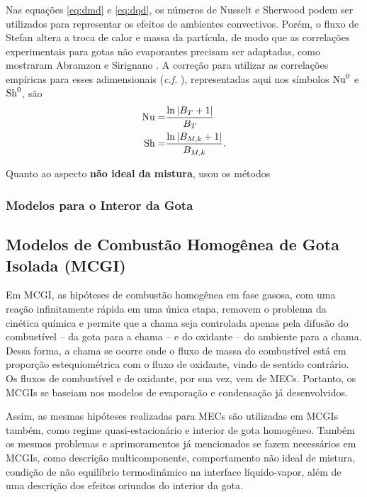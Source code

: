 Nas equações \eqref{eq:dmd} e \eqref{eq:dqd}, os números de Nusselt e Sherwood podem ser utilizados para representar os efeitos de ambientes convectivos.
Porém, o fluxo de Stefan altera a troca de calor e massa da partícula, de modo que as correlações experimentais para gotas não evaporantes precisam ser adaptadas, como mostraram Abramzon e Sirignano \cite{Sirignano1989}.
A correção para utilizar as correlações empíricas para esses adimensionais  (\emph{c.f.} \cite[eqs. (8) e (9)]{SacomanoF2025CF}), representadas aqui nos símbolos $\mathrm{Nu}^0$ e $\mathrm{Sh}^0$, são
\begin{align}
    \mathrm{Nu} =& \frac{\ln \left|B_T + 1\right|}{B_T} \\
    \mathrm{Sh} =& \frac{\ln \left|B_{M,k} + 1\right|}{B_{M,k}}.
\end{align}


Quanto ao aspecto \textbf{não ideal da mistura}, \cite{SacomanoF2022IJHMT} usou os métodos 


\subsubsection{Modelos para o Interor da Gota} \label{sec:int}



\subsection{Modelos de Combustão Homogênea de Gota Isolada (MCGI)} \label{sec:MCGI}

Em MCGI, as hipóteses de combustão homogênea em fase gasosa, com uma reação infinitamente rápida em uma única etapa, removem o problema da cinética química e permite que a chama seja controlada apenas pela difusão do combustível -- da gota para a chama -- e do oxidante -- do ambiente para a chama.
Dessa forma, a chama se ocorre onde o fluxo de massa do combustível está em proporção estequiométrica com o fluxo de oxidante, vindo de sentido contrário. 
Os fluxos de combustível e de oxidante, por sua vez, vem de MECs.
Portanto, os MCGIs se baseiam nos modelos de evaporação e condensação já desenvolvidos.

Assim, as mesmas hipóteses realizadas para MECs são utilizadas em MCGIs também, como regime quasi-estacionário e interior de gota homogêneo.
Também os mesmos problemas e aprimoramentos já mencionados se fazem necessários em MCGIs, como descrição multicomponente, comportamento não ideal de mistura, condição de não equilíbrio termodinâmico na interface líquido-vapor, além de uma descrição dos efeitos oriundos do interior da gota.

